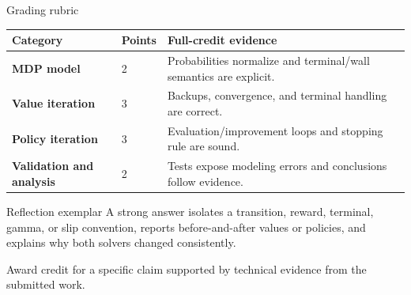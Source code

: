 \documentclass[aspectratio=169,11pt]{beamer}
\begin{document}
\begin{frame}{Grading rubric}
\scriptsize
\begin{tabularx}{\textwidth}{>{\bfseries}p{} p{} X}
\toprule
Category & Points & Full-credit evidence \\
\midrule
MDP model & 2 & Probabilities normalize and terminal/wall semantics are explicit. \\
Value iteration & 3 & Backups, convergence, and terminal handling are correct. \\
Policy iteration & 3 & Evaluation/improvement loops and stopping rule are sound. \\
Validation and analysis & 2 & Tests expose modeling errors and conclusions follow evidence. \\
\bottomrule
\end{tabularx}
\end{frame}

\begin{frame}{Reflection exemplar}
\small
\answerlabel A strong answer isolates a transition, reward, terminal, gamma, or slip convention, reports before-and-after values or policies, and explains why both solvers changed consistently.

\vspace{0.25cm}
\gradinglabel Award credit for a specific claim supported by technical evidence from the submitted work.
\end{frame}
\end{document}
